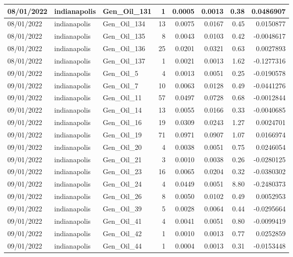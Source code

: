 \documentclass[
  letterpaper,
  DIV=11,
  numbers=noendperiod]{scrartcl}
\begin{document}
\begin{tabular}{l|l|l|r|r|r|r|r}
\hline
08/01/2022 & indianapolis & Gen\_Oil\_131 & 1 & 0.0005 & 0.0013 & 0.38 & 0.0486907\\
\hline
08/01/2022 & indianapolis & Gen\_Oil\_134 & 13 & 0.0075 & 0.0167 & 0.45 & 0.0150877\\
\hline
08/01/2022 & indianapolis & Gen\_Oil\_135 & 8 & 0.0043 & 0.0103 & 0.42 & -0.0048617\\
\hline
08/01/2022 & indianapolis & Gen\_Oil\_136 & 25 & 0.0201 & 0.0321 & 0.63 & 0.0027893\\
\hline
08/01/2022 & indianapolis & Gen\_Oil\_137 & 1 & 0.0021 & 0.0013 & 1.62 & -0.1277316\\
\hline
09/01/2022 & indianapolis & Gen\_Oil\_5 & 4 & 0.0013 & 0.0051 & 0.25 & -0.0190578\\
\hline
09/01/2022 & indianapolis & Gen\_Oil\_7 & 10 & 0.0063 & 0.0128 & 0.49 & -0.0441276\\
\hline
09/01/2022 & indianapolis & Gen\_Oil\_11 & 57 & 0.0497 & 0.0728 & 0.68 & -0.0012844\\
\hline
09/01/2022 & indianapolis & Gen\_Oil\_14 & 13 & 0.0055 & 0.0166 & 0.33 & -0.0040685\\
\hline
09/01/2022 & indianapolis & Gen\_Oil\_16 & 19 & 0.0309 & 0.0243 & 1.27 & 0.0024701\\
\hline
09/01/2022 & indianapolis & Gen\_Oil\_19 & 71 & 0.0971 & 0.0907 & 1.07 & 0.0166974\\
\hline
09/01/2022 & indianapolis & Gen\_Oil\_20 & 4 & 0.0038 & 0.0051 & 0.75 & 0.0246054\\
\hline
09/01/2022 & indianapolis & Gen\_Oil\_21 & 3 & 0.0010 & 0.0038 & 0.26 & -0.0280125\\
\hline
09/01/2022 & indianapolis & Gen\_Oil\_23 & 16 & 0.0065 & 0.0204 & 0.32 & -0.0380302\\
\hline
09/01/2022 & indianapolis & Gen\_Oil\_24 & 4 & 0.0449 & 0.0051 & 8.80 & -0.2480373\\
\hline
09/01/2022 & indianapolis & Gen\_Oil\_26 & 8 & 0.0050 & 0.0102 & 0.49 & 0.0052953\\
\hline
09/01/2022 & indianapolis & Gen\_Oil\_39 & 5 & 0.0028 & 0.0064 & 0.44 & -0.0295664\\
\hline
09/01/2022 & indianapolis & Gen\_Oil\_41 & 4 & 0.0041 & 0.0051 & 0.80 & -0.0099419\\
\hline
09/01/2022 & indianapolis & Gen\_Oil\_42 & 1 & 0.0010 & 0.0013 & 0.77 & 0.0252859\\
\hline
09/01/2022 & indianapolis & Gen\_Oil\_44 & 1 & 0.0004 & 0.0013 & 0.31 & -0.0153448\\

\end{tabular}
\end{document}
